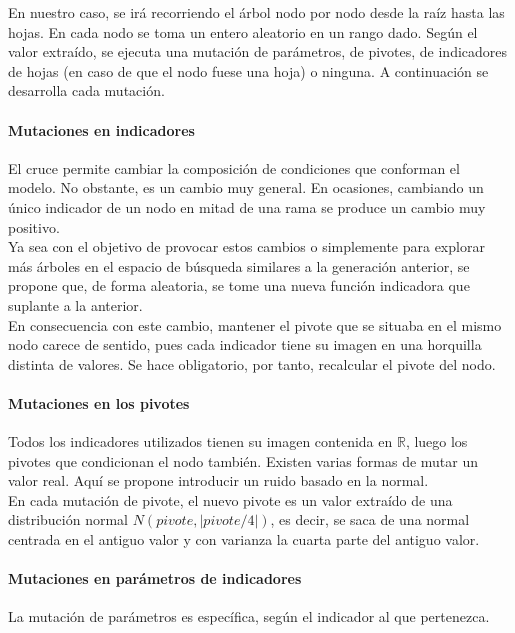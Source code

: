  En nuestro caso, se ir\'a recorriendo el \'arbol nodo por nodo desde la ra\'iz hasta las hojas. En cada nodo se toma un entero aleatorio en un rango dado. Seg\'un el valor extra\'ido, se ejecuta una mutaci\'on de par\'ametros, de pivotes, de indicadores de hojas (en caso de que el nodo fuese una hoja) o ninguna. A continuaci\'on se desarrolla cada mutaci\'on.\\

\paragraph{Mutaciones en indicadores}
El cruce permite cambiar la composici\'on de condiciones que conforman el modelo. No obstante, es un cambio muy general. En ocasiones, cambiando un \'unico indicador de un nodo en mitad de una rama se produce un cambio muy positivo.\\

Ya sea con el objetivo de provocar estos cambios o simplemente para explorar m\'as \'arboles en el espacio de b\'usqueda similares a la generaci\'on anterior, se propone que, de forma aleatoria, se tome una nueva funci\'on indicadora que suplante a la anterior. \\

En consecuencia con este cambio, mantener el pivote que se situaba en el mismo nodo carece de sentido, pues cada indicador tiene su imagen en una horquilla distinta de valores. Se hace obligatorio, por tanto, recalcular el pivote del nodo.\\  

\paragraph{Mutaciones en los pivotes}

Todos los indicadores utilizados tienen su imagen contenida en $\mathbb{R}$, luego los pivotes que condicionan el nodo tambi\'en. Existen varias formas de mutar un valor real. Aqu\'i se propone introducir un ruido basado en la normal.\\

En cada mutaci\'on de pivote, el nuevo pivote es un valor extra\'ido de una distribuci\'on normal $N(pivote, |pivote/4|)$, es decir, se saca de una normal centrada en el antiguo valor y con varianza la cuarta parte del antiguo valor.\\

\paragraph{Mutaciones en par\'ametros de indicadores}
La mutaci\'on de par\'ametros es espec\'ifica, seg\'un el indicador al que pertenezca.\\

